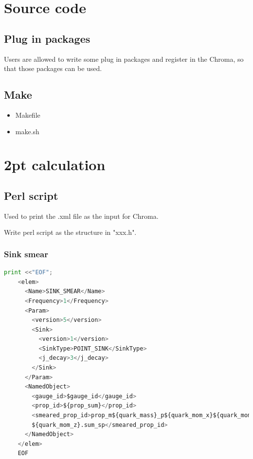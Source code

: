 \documentclass{article}
\begin{document}
\section{Source code}

\subsection{Plug in packages}

Users are allowed to write some plug in packages and register in the Chroma, so that those packages can be used.

\subsection{Make}

\begin{itemize}
    \item Makefile
    \item make.sh 
\end{itemize}

\section{2pt calculation}

\subsection{Perl script}

Used to print the .xml file as the input for Chroma.

Write perl script as the structure in "xxx.h".

\subsubsection{Sink smear}

\begin{lstlisting}[language=Python]
    print <<"EOF";
    <elem>
      <Name>SINK_SMEAR</Name>
      <Frequency>1</Frequency>
      <Param>
        <version>5</version>
        <Sink>
          <version>1</version>
          <SinkType>POINT_SINK</SinkType>
          <j_decay>3</j_decay>
        </Sink>
      </Param>
      <NamedObject>
        <gauge_id>$gauge_id</gauge_id>
        <prop_id>${prop_sum}</prop_id> 
        <smeared_prop_id>prop_m${quark_mass}_p${quark_mom_x}${quark_mom_y}
        ${quark_mom_z}.sum_sp</smeared_prop_id>
      </NamedObject>
    </elem>
    EOF
\end{lstlisting}
\end{document}

